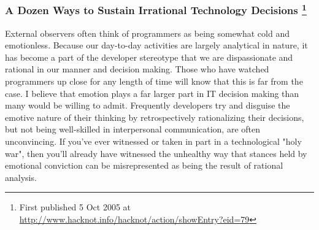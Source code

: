 \documentclass{article}
\begin{document}
\subsubsection{A Dozen Ways to Sustain Irrational Technology Decisions  \footnote{First published 5 Oct 2005 at
\url{http://www.hacknot.info/hacknot/action/showEntry?eid=79}}}
\label{sec:orgheadline51}

External observers often think of programmers as being somewhat cold and
emotionless. Because our day-to-day activities are largely analytical in
nature, it has become a part of the developer stereotype that we are
dispassionate and rational in our manner and decision making. Those who
have watched programmers up close for any length of time will know that
this is far from the case. I believe that emotion plays a far larger
part in IT decision making than many would be willing to admit.
Frequently developers try and disguise the emotive nature of their
thinking by retrospectively rationalizing their decisions, but not being
well-skilled in interpersonal communication, are often unconvincing. If
you've ever witnessed or taken in part in a technological "holy war",
then you'll already have witnessed the unhealthy way that stances held
by emotional conviction can be misrepresented as being the result of
rational analysis.
\end{document}
